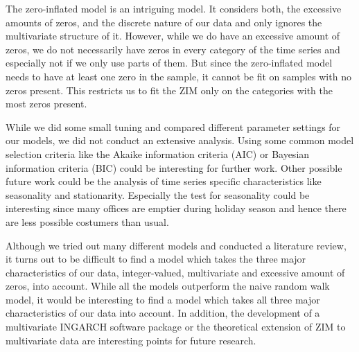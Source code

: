 The zero-inflated model is an intriguing model. It considers both, the excessive amounts of zeros, and the discrete nature of our data and only ignores the multivariate structure of it. However, while we do have an excessive amount of zeros, we do not necessarily have zeros in every category of the time series and especially not if we only use parts of them. But since the zero-inflated model needs to have at least one zero in the sample, it cannot be fit on samples with no zeros present. This restricts us to fit the ZIM only on the categories with the most zeros present. 

While we did some small tuning and compared different parameter settings for our models, we did not conduct an extensive analysis. Using some common model selection criteria like the Akaike information criteria (AIC) or Bayesian information criteria (BIC) could be interesting for further work. Other possible future work could be the analysis of time series specific characteristics like seasonality and stationarity. Especially the test for seasonality could be interesting since many offices are emptier during holiday season and hence there are less possible costumers than usual. 

Although we tried out many different models and conducted a literature review, it turns out to be difficult to find a model which takes the three major characteristics of our data, integer-valued, multivariate and excessive amount of zeros, into account. While all the models outperform the naive random walk model, it would be interesting to find a model which takes all three major characteristics of our data into account. In addition, the development of a multivariate INGARCH software package or the theoretical extension of ZIM to multivariate data are interesting points for future research. 